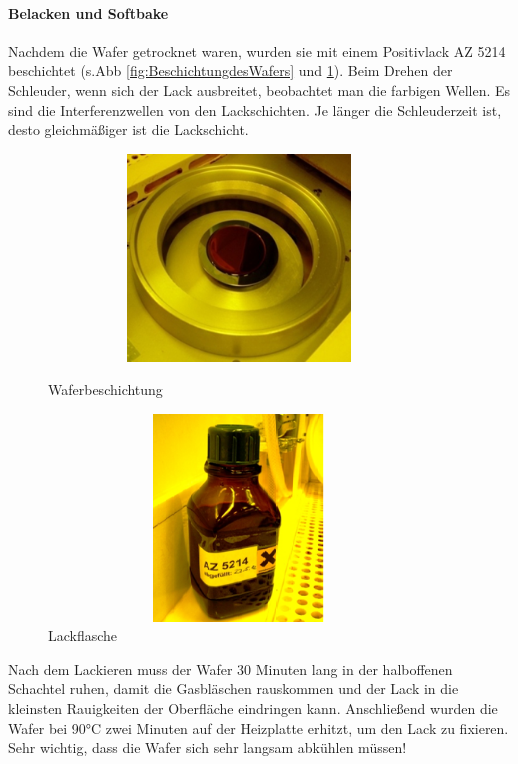 \paragraph[Belacken und Softbake]{Belacken und Softbake}

Nachdem die Wafer getrocknet waren, wurden sie mit einem Positivlack AZ 5214 beschichtet (s.Abb \ref{fig:BeschichtungdesWafers} und \ref{fig:Lackflasche}).
Beim Drehen der Schleuder, wenn sich der Lack ausbreitet, beobachtet man die farbigen Wellen. Es sind die Interferenzwellen von den Lackschichten. Je länger die Schleuderzeit ist, desto gleichmäßiger ist die Lackschicht.

\begin{figure}[H]
\centering
\begin{minipage}[hbt]{6cm}
    \centering
    \includegraphics[width=0.9\textwidth, height=5.5cm]{bilder/BeschichtungdesWafers.png}
  \caption{Waferbeschichtung}
  \label{fig:BeschichtungdesWafers}
\end{minipage}
\begin{minipage}[hbt]{6cm}
    \centering
    \includegraphics[width=0.9\textwidth,height=5.5cm]{bilder/Lackflasche.png}
  \caption{Lackflasche}
  \label{fig:Lackflasche}
\end{minipage}

\end{figure}




Nach dem Lackieren muss der Wafer 30 Minuten lang in der halboffenen Schachtel
ruhen, damit die Gasbläschen rauskommen und der Lack in die kleinsten Rauigkeiten der
Oberfläche eindringen kann.
Anschließend wurden die Wafer bei 90°C zwei Minuten auf der Heizplatte erhitzt, um
den Lack zu fixieren. Sehr wichtig, dass die Wafer sich sehr langsam abkühlen müssen!


